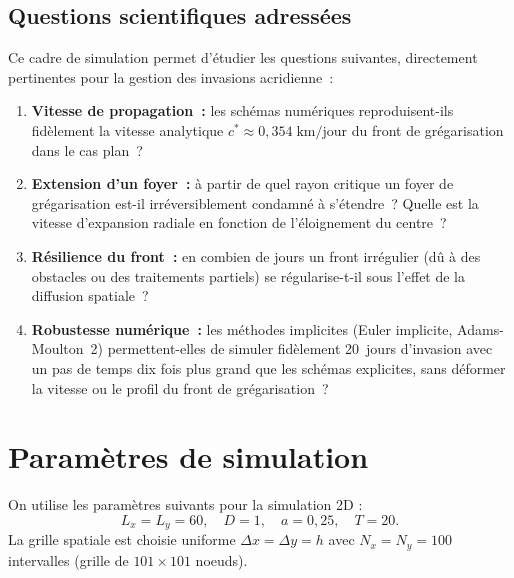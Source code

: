 \documentclass[11pt,a4paper]{report}
\begin{document}
\subsection*{Questions scientifiques adress\'ees}

Ce cadre de simulation permet d'\'etudier les questions suivantes, directement
pertinentes pour la gestion des invasions acridienne~:

\begin{enumerate}[leftmargin=2em]
  \item \textbf{Vitesse de propagation~:} les sch\'emas num\'eriques reproduisent-ils
        fid\`element la vitesse analytique $c^* \approx 0{,}354\;\text{km/jour}$ du
        front de gr\'egarisation dans le cas plan~?

  \item \textbf{Extension d'un foyer~:} \`a partir de quel rayon critique un foyer
        de gr\'egarisation est-il irr\'eversiblement condamn\'e \`a s'\'etendre~?
        Quelle est la vitesse d'expansion radiale en fonction de l'\'eloignement
        du centre~?

  \item \textbf{R\'esilience du front~:} en combien de jours un front irr\'egulier
        (d\^u \`a des obstacles ou des traitements partiels) se r\'egularise-t-il
        sous l'effet de la diffusion spatiale~?

  \item \textbf{Robustesse num\'erique~:} les m\'ethodes implicites (Euler implicite,
        Adams-Moulton~2) permettent-elles de simuler fid\`element 20~jours d'invasion
        avec un pas de temps dix fois plus grand que les sch\'emas explicites, sans
        d\'eformer la vitesse ou le profil du front de gr\'egarisation~?
\end{enumerate}
\section{Param\`etres de simulation}

On utilise les param\`etres suivants pour la simulation 2D :
\begin{equation}
  L_x=L_y=60,\quad D=1,\quad a=0{,}25,\quad T=20.
\end{equation}
La grille spatiale est choisie uniforme $\Delta x=\Delta y=h$ avec $N_x=N_y=100$
intervalles (grille de $101\times 101$ noeuds).
\end{document}
